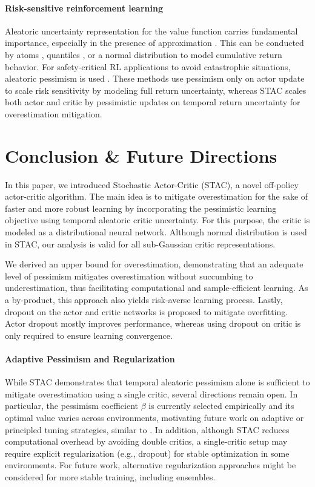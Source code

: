 \documentclass{article}
\begin{document}
\paragraph{Risk-sensitive reinforcement learning}  
Aleatoric uncertainty representation for the value function carries fundamental importance, especially in the presence of approximation \citep{bellemare2017distributional}. This can be conducted by atoms \citep{bellemare2017distributional}, quantiles \citep{dabney2018distributional, ma2025dsac}, or a normal distribution \citep{tang2019worst, yang2021wcsac} to model cumulative return behavior. For safety-critical RL applications to avoid catastrophic situations, aleatoric pessimism is used \citep{tang2019worst,yang2021wcsac,lim2022distributional,greenberg2022efficient,ma2025dsac}. These methods use pessimism only on actor update to scale risk sensitivity by modeling full return uncertainty, whereas STAC scales both actor and critic by pessimistic updates on temporal return uncertainty for overestimation mitigation. 

\section{Conclusion \& Future Directions}

In this paper, we introduced Stochastic Actor-Critic (STAC), a novel off-policy actor-critic algorithm. The main idea is to mitigate overestimation for the sake of faster and more robust learning by incorporating the pessimistic learning objective using temporal aleatoric critic uncertainty. For this purpose, the critic is modeled as a distributional neural network. Although normal distribution is used in STAC, our analysis is valid for all sub-Gaussian critic representations. 

We derived an upper bound for overestimation, demonstrating that an adequate level of pessimism mitigates overestimation without succumbing to underestimation, thus facilitating computational and sample-efficient learning. As a by-product, this approach also yields risk-averse learning process. Lastly, dropout on the actor and critic networks is proposed to mitigate overfitting. Actor dropout mostly improves performance, whereas using dropout on critic is only required to ensure learning convergence. 

\paragraph{Adaptive Pessimism and Regularization} While STAC demonstrates that temporal aleatoric pessimism alone is sufficient to mitigate overestimation using a single critic, several directions remain open. In particular, the pessimism coefficient $\beta$ is currently selected empirically and its optimal value varies across environments, motivating future work on adaptive or principled tuning strategies, similar to \citet{moskovitz2021tactical, cetin2023learning}. In addition, although STAC reduces computational overhead by avoiding double critics, a single-critic setup may require explicit regularization (e.g., dropout) for stable optimization in some environments. For future work, alternative regularization approaches might be considered for more stable training, including ensembles. 
\end{document}
